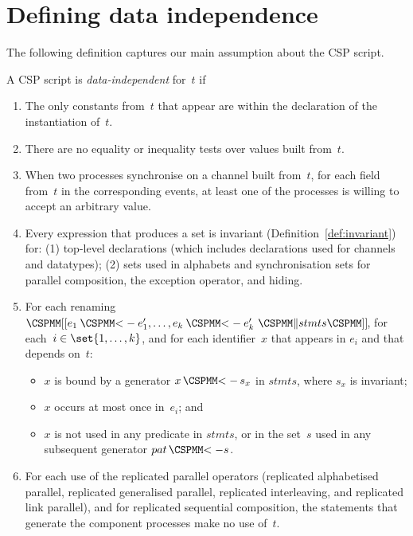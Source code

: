 \section{Defining data independence}  

The following definition captures our main assumption about the CSP script.
%
\begin{definition}
\label{defn:data-independent}
A CSP script is \emph{data-independent} for~$t$ if
\begin{enumerate}
\item The only constants from~$t$ that appear are within the declaration
  of the instantiation of~$t$.

\item There are no equality or inequality tests over values built from~$t$.

\item\label{item:sync} When two processes synchronise on a channel built
  from~$t$, for each field from~$t$ in the corresponding events, at least one
  of the processes is willing to accept an arbitrary value.

\item\label{item:di-invariant} Every expression that produces a set is
  invariant (Definition~\ref{def:invariant}) for: (1) top-level declarations
  (which includes declarations used for channels and datatypes); (2) sets used
  in alphabets and synchronisation sets for parallel composition, the
  exception operator, and hiding.

\item\label{item:di-renaming} For each renaming $\rename{e_1 \lArrow e_1',
  \ldots, e_k \lArrow e_k' ~ \M\| stmts}$, for each~$i \in \set{1,\ldots,k}$,
  and for each identifier~$x$ that appears in $e_i$ and that depends on~$t$:
%
  \begin{itemize}
  \item $x$ is bound by a generator $x \,\M{<-}\, s_x$ in $stmts$, where $s_x$
    is invariant; 

  \item $x$ occurs at most once in~$e_i$; and

  \item $x$ is not used in any predicate in $stmts$, or in the set~$s$ used in
  any subsequent generator $pat \,\M{<-} s$.
  \end{itemize}

\item\label{item:indexing} For each use of the replicated parallel operators
  (replicated alphabetised parallel, replicated generalised parallel,
  replicated interleaving, and replicated link parallel), and for replicated
  sequential composition, the statements that generate the component processes
  make no use of~$t$. 



\end{enumerate}
\end{definition}
